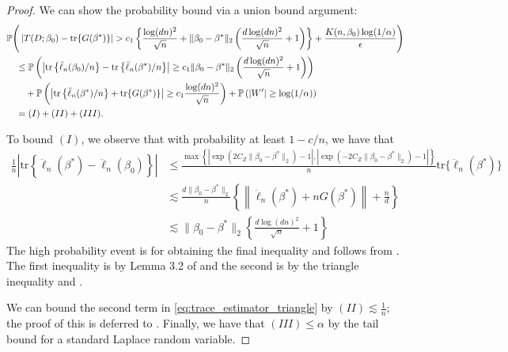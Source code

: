 \documentclass[11pt]{article}
\begin{document}
\begin{proof}
We can show the probability bound via a union bound argument: 
\begin{align}
     &\mathbb{P}\Bigg( \left|T(D; \beta_0) - \mathrm{tr}\{G(\beta^*)\} \right| > c_1 \left \{  \frac{\log(dn)^2}{\sqrt{n}} + \|\beta_0-\beta^*\|_2 \left( \frac{d\log(dn)^2}{\sqrt{n}} + 1 \right) \right\} + \frac{K(n, \beta_0)\log(1/\alpha)}{\epsilon}  \Bigg) \notag \\
     &\quad \leq  \mathbb{P} \left(\left|\mathrm{tr}\left\{\ddot{\ell}_n(\beta_0)/n\right\} - \mathrm{tr}\left\{\ddot{\ell}_n(\beta^*)/n\right\} \right| \geq c_1 \|\beta_0-\beta^*\|_2 \left( \frac{d\log(dn)^2}{\sqrt{n}} + 1 \right)  \right) \notag\\
     &\quad \quad + \mathbb{P}\left(\left|\mathrm{tr}\left\{\ddot{\ell}_n(\beta^*)/n\right\} + \mathrm{tr}\{G(\beta^*)\} \right| \geq c_1 \frac{\log(dn)^2}{\sqrt{n}}\right) + \mathbb{P} \left( |W'| \geq \log(1/\alpha) \right) \notag\\
     &\quad = (I) + (II) + (III).    \label{eq:trace_estimator_triangle}
\end{align}

To bound $(I)$, we observe that with probability at least $1 - c/n$, we have that
\begin{align*}
    \frac{1}{n}\left|\mathrm{tr} \left\{\ddot{\ell}_n(\beta^*) - \ddot{\ell}_n(\beta_0) \right\} \right| &\leq \frac{\max \left\{|\exp(2C_Z\|\beta_0 - \beta^*\|_2) - 1|, |\exp(-2 C_Z \|\beta_0 - \beta^*\|_2) - 1| \right\}}{n} \mathrm{tr}\{\ddot{\ell}_n(\beta^*)\}\\
    &\lesssim \frac{d \|\beta_0-\beta^*\|_2}{n} \left\{ \left\|\ddot{\ell}_n(\beta^*) + nG(\beta^*) \right\| + \frac{n}{d} \right\} \\
    &\lesssim \|\beta_0-\beta^*\|_2 \left\{ \frac{d\log(dn)^2}{\sqrt{n}} + 1 \right\}
\end{align*}
The high probability event is for obtaining the final inequality and follows from . The first inequality is by Lemma 3.2 of \cite{huang2013oracle} and the second is by the triangle inequality and .  

We can bound the second term in \eqref{eq:trace_estimator_triangle} by $(II) \lesssim \frac{1}{n}$; the proof of this is deferred to . Finally, we have that $(III) \leq \alpha$ by the tail bound for a standard Laplace random variable. 
\end{proof}
\end{document}

